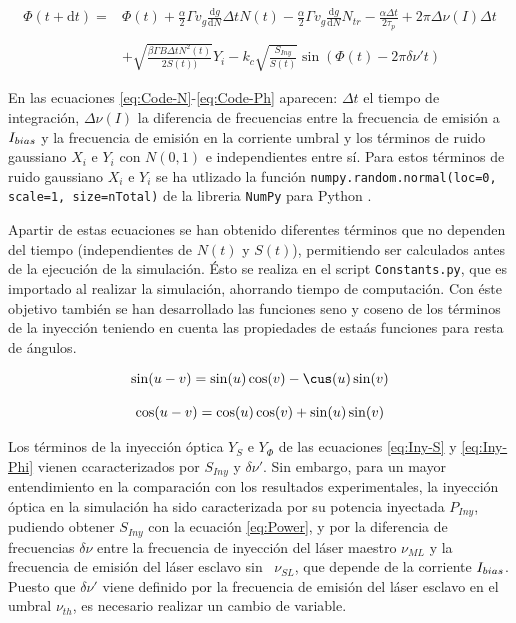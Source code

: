 			\begin{equation}
				\begin{matrix}
					\Phi(t + \mathrm{d}t) =  & \Phi(t) + \frac{\alpha}{2}\Gamma v_g \frac{\mathrm{d}g}{\mathrm{d}N} \Delta t N(t) - \frac{\alpha}{2}\Gamma v_g \frac{\mathrm{d} g}{\mathrm{d}N} N_{tr} - \frac{\alpha\Delta t}{2\tau_p} + 2\pi\Delta\nu(I)\Delta t \\ \\
					& + \sqrt{\frac{\beta \Gamma B \Delta t N^2(t)}{2 S(t))}} Y_i - k_c\sqrt{\frac{S_{Iny}}{S(t)}} \sin(\Phi(t) - 2\pi \delta\nu't)
				\end{matrix}
				\label{eq:Code-Ph}
			\end{equation}

		En las ecuaciones \ref{eq:Code-N}-\ref{eq:Code-Ph} aparecen: $\Delta t$ el tiempo de integraci\'on, $\Delta\nu(I)$ la diferencia de frecuencias entre la frecuencia de emisi\'on a $I_{bias}$ y la frecuencia de emisi\'on en la corriente umbral \cite{Chaves19} y los t\'erminos de ruido gaussiano $X_i$ e $Y_i$ con $N(0, 1)$ e independientes entre s\'i. Para estos t\'erminos de ruido gaussiano $X_i$ e $Y_i$ se ha utlizado la funci\'on \texttt{numpy.random.normal(loc=0, scale=1, size=nTotal)} de la libreria \texttt{NumPy} para Python \cite{numpy}.

		Apartir de estas ecuaciones se han obtenido diferentes t\'erminos que no dependen del tiempo (independientes de $N(t)$ y $S(t)$), permitiendo ser calculados antes de la ejecuci\'on de la simulaci\'on. \'Esto se realiza en el script \texttt{Constants.py}, que es importado al realizar la simulaci\'on, ahorrando tiempo de computaci\'on. Con \'este objetivo tambi\'en se han desarrollado las funciones seno y coseno de los t\'erminos de la inyecci\'on teniendo en cuenta las propiedades de esta\'as funciones para resta de \'angulos.

			\begin{equation}
				\begin{matrix}
					\sin(u - v) = \sin(u)\cos(v) - \cus(u)\sin(v) \\ \\

					\cos(u - v) = \cos(u)\cos(v) + \sin(u)\sin(v) 
				\end{matrix}
			\end{equation}

		Los t\'erminos de la inyecci\'on \'optica $Y_S$ e $Y_{\Phi}$ de las ecuaciones \ref{eq:Iny-S} y \ref{eq:Iny-Phi} vienen ccaracterizados por $S_{Iny}$ y $\delta\nu'$. Sin embargo, para un mayor entendimiento en la comparaci\'on con los resultados experimentales, la inyecci\'on \'optica en la simulaci\'on ha sido caracterizada por su potencia inyectada $P_{Iny}$, pudiendo obtener $S_{Iny}$ con la ecuaci\'on \ref{eq:Power}, y por la diferencia de frecuencias $\delta\nu$ entre la frecuencia de inyecci\'on del l\'aser maestro $\nu_{ML}$ y la frecuencia de emisi\'on del l\'aser esclavo sin \gs\ $\nu_{SL}$, que depende de la corriente $I_{bias}$. Puesto que $\delta\nu'$ viene definido por la frecuencia de emisi\'on del l\'aser esclavo en el umbral $\nu_{th}$, es necesario realizar un cambio de variable.

